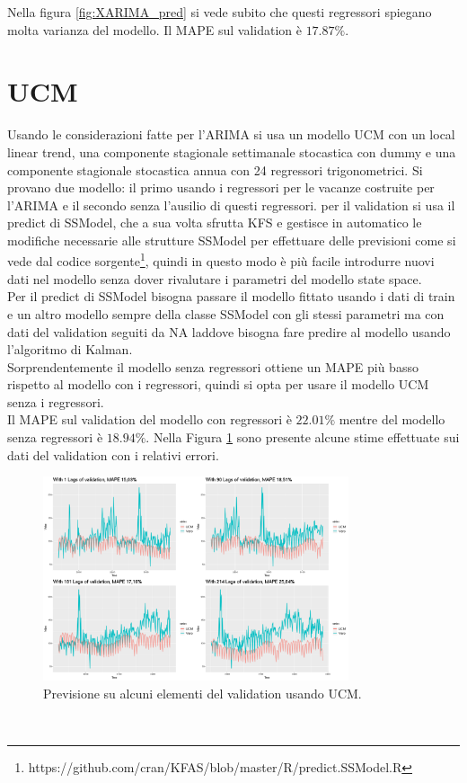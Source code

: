 \documentclass[12pt, onecolumn]{article}
\begin{document}
Nella figura \ref{fig:XARIMA_pred} si vede subito che questi regressori spiegano molta varianza del modello.
Il MAPE sul validation è $17.87\%$. 
\section*{UCM}
Usando le considerazioni fatte per l'ARIMA si usa un modello UCM con un local linear trend, una componente stagionale settimanale stocastica con dummy e una componente stagionale stocastica annua con 24 regressori trigonometrici.
Si provano due modello: il primo usando i regressori per le vacanze costruite per l'ARIMA e il secondo senza l'ausilio di questi regressori.
per il validation si usa il predict di SSModel, che a sua volta sfrutta KFS e gestisce in automatico le modifiche necessarie alle strutture SSModel per effettuare delle previsioni come si vede dal codice sorgente\footnote{https://github.com/cran/KFAS/blob/master/R/predict.SSModel.R}, quindi in questo modo è più facile introdurre nuovi dati nel modello senza dover rivalutare i parametri del modello state space.\\
Per il predict di SSModel bisogna passare il modello fittato usando i dati di train e un altro modello sempre della classe SSModel con gli stessi parametri ma con dati del validation seguiti da NA laddove bisogna fare predire al modello usando l'algoritmo di Kalman.\\
Sorprendentemente il modello senza regressori ottiene un MAPE più basso rispetto al modello con i regressori, quindi si opta per usare il modello UCM senza i regressori.\\
Il MAPE sul validation del modello con regressori è $22.01\%$ mentre del modello senza regressori è $18.94\%$. Nella Figura \ref{fig:UCM_pred} sono presente alcune stime effettuate sui dati del validation con i relativi errori.
\begin{figure}[!h]
  \centering
  \includegraphics[width=\linewidth,height=6cm]{imgs/forecast_ucm.png}
  \caption{Previsione su alcuni elementi del validation usando UCM.}
  \label{fig:UCM_pred}
\end{figure}\\
\end{document}
